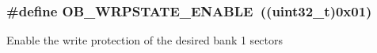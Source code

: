 \subsubsection[{\texorpdfstring{O\+B\+\_\+\+W\+R\+P\+S\+T\+A\+T\+E\+\_\+\+E\+N\+A\+B\+LE}{OB_WRPSTATE_ENABLE}}]{\setlength{\rightskip}{0pt plus 5cm}\#define O\+B\+\_\+\+W\+R\+P\+S\+T\+A\+T\+E\+\_\+\+E\+N\+A\+B\+LE~((uint32\+\_\+t)0x01)}\hypertarget{group___f_l_a_s_h_ex___w_r_p___state_ga9fc463145ab57616baa36d95523186a1}{}\label{group___f_l_a_s_h_ex___w_r_p___state_ga9fc463145ab57616baa36d95523186a1}
Enable the write protection of the desired bank 1 sectors 